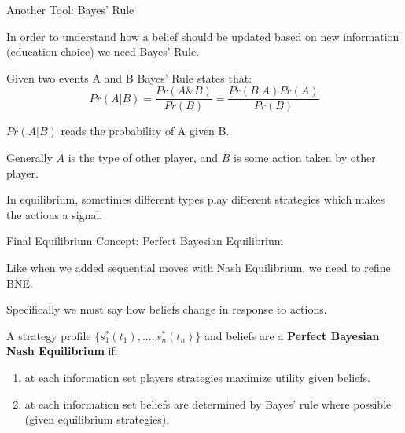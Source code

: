 \documentclass[aspectratio=169]{beamer}
\newenvironment{wideitemize}{\itemize\addtolength{\itemsep}{10pt}}{\enditemize}
\begin{document}
\begin{frame}{Another Tool: Bayes' Rule}

\begin{wideitemize}
    \item In order to understand how a belief should be updated based on new information (education choice) we need Bayes' Rule.
    
    \begin{theorem}
    Given two events A and B Bayes' Rule states that:
    \[Pr(A | B) = \frac{Pr(A \& B)}{Pr(B)} = \frac{Pr(B | A)Pr(A)}{Pr(B)} \]
    \end{theorem}
    \item $Pr(A|B)$ reads the probability of A given B.
    \item Generally $A$ is the type of other player, and $B$ is some action taken by other player.
    \item In equilibrium, sometimes different types play different strategies which makes the actions a signal.
\end{wideitemize}
    
\end{frame}
\begin{frame}{Final Equilibrium Concept: Perfect Bayesian Equilibrium}
    \begin{wideitemize}
        \item Like when we added sequential moves with Nash Equilibrium, we need to refine BNE.
        \item Specifically we must say how beliefs change in response to actions.
        
        \begin{definition}
        A strategy profile $\{s_1^*(t_1), ...,s_n^*(t_n)\}$ and beliefs are a \textbf{Perfect Bayesian Nash Equilibrium} if:
        \begin{enumerate}
            \item at each information set players strategies maximize utility given beliefs.
            \item at each information set beliefs are determined by Bayes' rule where possible (given equilibrium strategies).
        \end{enumerate}
        \end{definition}
    \end{wideitemize}
\end{frame}
\end{document}
